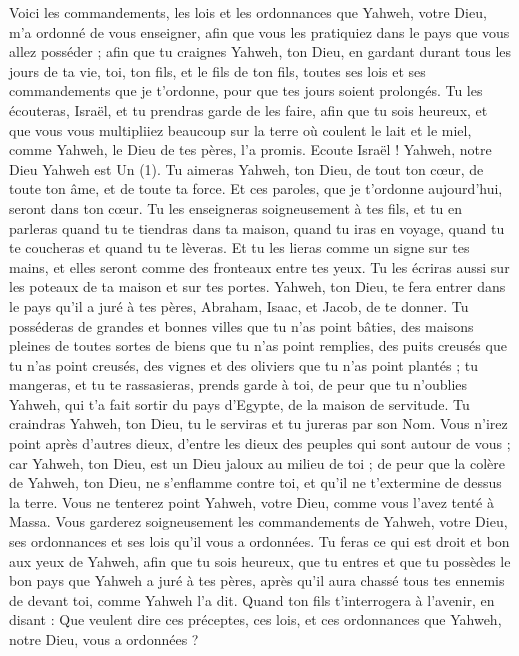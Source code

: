 \begin{multicols}{2}
\VerseOne{}Voici les commandements, les lois et les ordonnances que Yahweh, votre Dieu, m'a ordonné de vous enseigner, afin que vous les pratiquiez dans le pays que vous allez posséder ;
afin que tu craignes Yahweh, ton Dieu, en gardant durant tous les jours de ta vie, toi, ton fils, et le fils de ton fils, toutes ses lois et ses commandements que je t’ordonne, pour que tes jours soient prolongés.
Tu les écouteras, Israël, et tu prendras garde de les faire, afin que tu sois heureux, et que vous vous multipliiez beaucoup sur la terre où coulent le lait et le miel, comme Yahweh, le Dieu de tes pères, l'a promis.
Ecoute Israël ! Yahweh, notre Dieu Yahweh est Un (1).
Tu aimeras Yahweh, ton Dieu, de tout ton cœur, de toute ton âme, et de toute ta force.
Et ces paroles, que je t’ordonne aujourd'hui, seront dans ton cœur.
Tu les enseigneras soigneusement à tes fils, et tu en parleras quand tu te tiendras dans ta maison, quand tu iras en voyage, quand tu te coucheras et quand tu te lèveras.
Et tu les lieras comme un signe sur tes mains, et elles seront comme des fronteaux entre tes yeux.
Tu les écriras aussi sur les poteaux de ta maison et sur tes portes.
Yahweh, ton Dieu, te fera entrer dans le pays qu'il a juré à tes pères, Abraham, Isaac, et Jacob, de te donner. Tu posséderas de grandes et bonnes villes que tu n'as point bâties,
des maisons pleines de toutes sortes de biens que tu n'as point remplies, des puits creusés que tu n'as point creusés, des vignes et des oliviers que tu n'as point plantés ; tu mangeras, et tu te rassasieras,
prends garde à toi, de peur que tu n'oublies Yahweh, qui t'a fait sortir du pays d'Egypte, de la maison de servitude.
Tu craindras Yahweh, ton Dieu, tu le serviras et tu jureras par son Nom.
Vous n’irez point après d’autres dieux, d'entre les dieux des peuples qui sont autour de vous ;
car Yahweh, ton Dieu, est un Dieu jaloux au milieu de toi ; de peur que la colère de Yahweh, ton Dieu, ne s'enflamme contre toi, et qu'il ne t'extermine de dessus la terre.
Vous ne tenterez point Yahweh, votre Dieu, comme vous l'avez tenté à Massa.
Vous garderez soigneusement les commandements de Yahweh, votre Dieu, ses ordonnances et ses lois qu'il vous a ordonnées.
Tu feras ce qui est droit et bon aux yeux de Yahweh, afin que tu sois heureux, que tu entres et que tu possèdes le bon pays que Yahweh a juré à tes pères,
après qu’il aura chassé tous tes ennemis de devant toi, comme Yahweh l’a dit.
Quand ton fils t'interrogera à l’avenir, en disant : Que veulent dire ces préceptes, ces lois, et ces ordonnances que Yahweh, notre Dieu, vous a ordonnées ?

\end{multicols}
